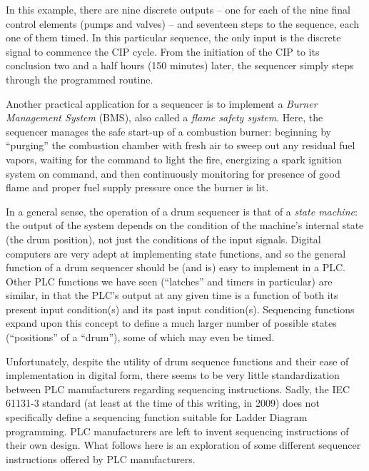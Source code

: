 In this example, there are nine discrete outputs -- one for each of the nine final control elements (pumps and valves) -- and seventeen steps to the sequence, each one of them timed.  In this particular sequence, the only input is the discrete signal to commence the CIP cycle.  From the initiation of the CIP to its conclusion two and a half hours (150 minutes) later, the sequencer simply steps through the programmed routine.

\vskip 10pt

Another practical application for a sequencer is to implement a \textit{Burner Management System} (BMS), also called a \textit{flame safety system}.  Here, the sequencer manages the safe start-up of a combustion burner: beginning by ``purging'' the combustion chamber with fresh air to sweep out any residual fuel vapors, waiting for the command to light the fire, energizing a spark ignition system on command, and then continuously monitoring for presence of good flame and proper fuel supply pressure once the burner is lit.      

\vskip 10pt

In a general sense, the operation of a drum sequencer is that of a \textit{state machine}: the output of the system depends on the condition of the machine's internal state (the drum position), not just the conditions of the input signals.  Digital computers are very adept at implementing state functions, and so the general function of a drum sequencer should be (and is) easy to implement in a PLC.  Other PLC functions we have seen (``latches'' and timers in particular) are similar, in that the PLC's output at any given time is a function of both its present input condition(s) and its past input condition(s).  Sequencing functions expand upon this concept to define a much larger number of possible states (``positions'' of a ``drum''), some of which may even be timed.

Unfortunately, despite the utility of drum sequence functions and their ease of implementation in digital form, there seems to be very little standardization between PLC manufacturers regarding sequencing instructions.  Sadly, the IEC 61131-3 standard (at least at the time of this writing, in 2009) does not specifically define a sequencing function suitable for Ladder Diagram programming.  PLC manufacturers are left to invent sequencing instructions of their own design.  What follows here is an exploration of some different sequencer instructions offered by PLC manufacturers.




